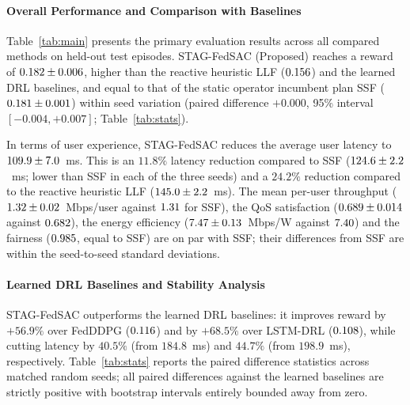 \paragraph{Overall Performance and Comparison with Baselines} 
Table~\ref{tab:main} presents the primary evaluation results across all compared methods on held-out test episodes. STAG-FedSAC (Proposed) reaches a reward of $0.182\pm0.006$, higher than the reactive heuristic LLF ($0.156$) and the learned DRL baselines, and equal to that of the static operator incumbent plan SSF ($0.181\pm0.001$) within seed variation (paired difference $+0.000$, 95\% interval $[-0.004,+0.007]$; Table~\ref{tab:stats}). 

In terms of user experience, STAG-FedSAC reduces the average user latency to $109.9\pm7.0$~ms. This is an $11.8\%$ latency reduction compared to SSF ($124.6\pm2.2$~ms; lower than SSF in each of the three seeds) and a $24.2\%$ reduction compared to the reactive heuristic LLF ($145.0\pm2.2$~ms). The mean per-user throughput ($1.32\pm0.02$~Mbps/user against $1.31$ for SSF), the QoS satisfaction ($0.689\pm0.014$ against $0.682$), the energy efficiency ($7.47\pm0.13$~Mbps/W against $7.40$) and the fairness ($0.985$, equal to SSF) are on par with SSF; their differences from SSF are within the seed-to-seed standard deviations.

\begin{table}[htbp]
\centering
\caption{Paired difference in reward between STAG-FedSAC and each compared method over matched random seeds (positive: STAG-FedSAC better), 95\% bootstrap confidence interval of the mean difference, exact two-sided sign-flip permutation $p$-value, and Bonferroni-adjusted $p$-value. The ``w/o Schedule'' model also uses the latent embedding, so its comparison with the proposed configuration changes two factors.}
\label{tab:stats}
\small
{}
\end{table}

\paragraph{Learned DRL Baselines and Stability Analysis} 
STAG-FedSAC outperforms the learned DRL baselines: it improves reward by $+56.9\%$ over FedDDPG ($0.116$) and by $+68.5\%$ over LSTM-DRL ($0.108$), while cutting latency by $40.5\%$ (from $184.8$~ms) and $44.7\%$ (from $198.9$~ms), respectively. Table~\ref{tab:stats} reports the paired difference statistics across matched random seeds; all paired differences against the learned baselines are strictly positive with bootstrap intervals entirely bounded away from zero.

